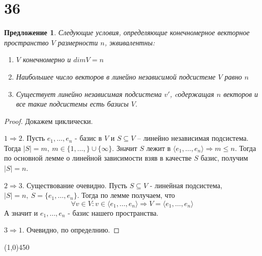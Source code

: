 \documentclass[a4paper,12pt]{article}
\newtheorem*{proposal}{Предложение}
\begin{document}
	\section*{36}
	\begin{proposal}
		Следующие условия, определяющие конечномерное векторное пространство $V$ размерности $n$, эквивалентны:
		\begin{enumerate}
			\item $V$ конечномерно и $dim V = n$
			\item Наибольшее число векторов в линейно независимой подсистеме $V$ равно $n$
			\item Существует линейно независимая подсистема $v'$, cодержащая $n$ векторов и все такие подсистемы есть базисы $V$.
		\end{enumerate}
	\end{proposal}
	\begin{proof}
		Докажем циклически.
		
		$1 \Rightarrow 2$. Пусть $e_1, \ldots, e_n$ - базис в $V$ и $S \subseteq V$ -- линейно независимая подсистема. Тогда $|S| = m, \ m \in \{1, \ldots, \} \cup \{\infty\}$. Значит $S$ лежит в $\langle e_1, \ldots, e_n \rangle \Rightarrow m \leqslant n$.
		Тогда по основной лемме о линейной зависимости взяв в качестве $S$ базис, получим $|S| = n$.
		
		$2 \Rightarrow 3$. Существование очевидно. Пусть $S \subseteq V$ - линейная подсистема, $|S| = n, \ S = \{e_1, \ldots, e_n\}$. Тогда по лемме получаем, что 
		\[
		\forall v \in V: v \in \langle e_1, \ldots, e_n \rangle
		\Rightarrow
		V = \langle e_1, \ldots, e_n \rangle
		\]
		А значит и $e_1, \ldots, e_n$ - базис нашего пространства.
		
		$3 \Rightarrow 1$. Очевидно, по определнию.
	\end{proof}
	
	\begin{center}
		\line(1,0){450}
	\end{center}
\end{document}
